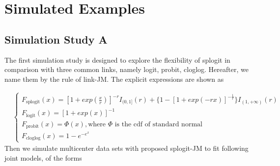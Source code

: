 \section{Simulated Examples} \label{sec:chp2_sim}

\subsection{Simulation Study A}

The first simulation study is designed to explore the flexibility of splogit in comparison with three common links, namely logit, probit, cloglog. Hereafter, we name them by the rule of link-JM. The explicit expressions are shown as

\begin{align}
& \left \{\begin{array}{ll}
  F_{\mbox{splogit}}(x)= [1+exp(\frac{x}{r})]^{-r}I_{(0,1]}(r)+\big\{1-[1+exp(-rx)]^{-\frac{1}{r}}\big\} I_{(1,+\infty)}(r)\\ 
  F_{\mbox{logit}}(x)= [1+exp(x)]^{-1}\\ 
  F_{\mbox{probit}}(x)= \Phi(x), \mbox{where $\Phi$ is the cdf of standard normal }\\ 
  F_{\mbox{cloglog}}(x)= 1-e^{-e^x}
\end{array}\right.
\end{align}
Then we simulate multicenter data sets with proposed splogit-JM to fit following joint models, of the forms


